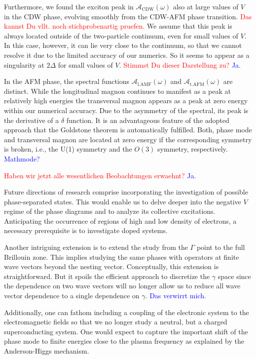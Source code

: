 \documentclass[
    reprint, 
    aps,
    preprintnumbers,
    twocolumn,
    prb,
    superscriptaddress
]{revtex4-2}
\newcommand{\spectral}[1]{\mathcal{A}_\text{#1}  (\omega)}
\newcommand{\red}[1]{\textcolor{red}{#1}}
\newcommand{\blue}[1]{\textcolor{blue}{#1}}
\begin{document}
Furthermore, we found the exciton peak in $\spectral{CDW}$ also at large values of $V$ in the CDW phase, 
evolving smoothly from the CDW-AFM phase transition. \red{Das kannst Du vllt. noch stichprobenartig pruefen.}
We assume that this peak is always located outside of the two-particle continuum, even for small values of $V$.
In this case, however, it can lie very close to the continuum, so that we cannot resolve it due to the limited accuracy of our numerics.
So it seems to appear as a singularity at $2\Delta$ for small values of $V$.
\red{Stimmst Du dieser Darstellung zu?} \blue{Ja.}

In the AFM phase, the spectral functions $\spectral{l.AMF}$ and $\spectral{t.AFM}$ are distinct.
While the longitudinal magnon continues to manifest as a peak at relatively high energies
the transversal magnon appears as a peak at zero energy within our numerical accuracy. Due to
the asymmetry of the spectral, its peak is the derivative of a $\delta$ function.
It is an advantageous feature of the adopted approach that the Goldstone theorem is 
automatically fulfilled. Both, phase mode and transversal magnon are located at zero energy
if the corresponding symmetry is broken, i.e., the U(1) symmetry and the $O(3)$ symmetry,
respectively. \blue{Mathmode?}

\red{Haben wir jetzt alle wesentlichen Beobachtungen erwaehnt?} \blue{Ja.}


Future directions of research comprise incorporating the investigation of possible phase-separated states. 
This would enable us to delve deeper into the negative $V$ regime 
of the phase diagrams and to analyze its collective excitations. Anticipating the occurrence
of regions of high and low density of electrons, a necessary prerequisite is to investigate doped systems.

Another intriguing extension is to extend the study from the $\Gamma$ point to the full Brillouin zone.
This implies studying the same phases with operators at finite wave vectors beyond the nesting vector. 
Conceptually, this extension is straightforward. But it spoils the efficient approach
to discretize the $\gamma$ space since the dependence on two wave vectors will no longer
allow us to reduce all wave vector dependence to a single dependence on $\gamma$. \blue{Das verwirrt mich.}

Additionally, one can fathom including a coupling of the electronic system to the electromagnetic fields
so that we no longer study a neutral, but a charged superconducting system. One would expect
to capture the important shift of the phase mode to finite energies close to the plasma frequency 
as explained by the Anderson-Higgs mechanism.
\end{document}
